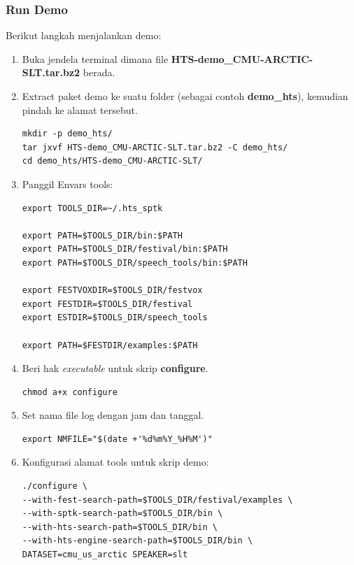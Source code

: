 \documentclass[12pt,]{article}
\begin{document}
	\subsubsection{Run Demo}
	Berikut langkah menjalankan demo:
	
	\begin{enumerate}
		\item Buka jendela terminal dimana file \textbf{HTS-demo\_CMU-ARCTIC-SLT.tar.bz2} berada.
		
		\item Extract paket demo ke suatu folder (sebagai contoh \textbf{demo\_hts}), kemudian pindah ke alamat tersebut.
		\begin{verbatim}
mkdir -p demo_hts/
tar jxvf HTS-demo_CMU-ARCTIC-SLT.tar.bz2 -C demo_hts/
cd demo_hts/HTS-demo_CMU-ARCTIC-SLT/
		\end{verbatim}
		
		\item Panggil Envars tools:
		\begin{verbatim}
export TOOLS_DIR=~/.hts_sptk

export PATH=$TOOLS_DIR/bin:$PATH
export PATH=$TOOLS_DIR/festival/bin:$PATH
export PATH=$TOOLS_DIR/speech_tools/bin:$PATH

export FESTVOXDIR=$TOOLS_DIR/festvox
export FESTDIR=$TOOLS_DIR/festival
export ESTDIR=$TOOLS_DIR/speech_tools

export PATH=$FESTDIR/examples:$PATH
		\end{verbatim}
		
		\newpage
		\item Beri hak \textit{executable} untuk skrip \textbf{configure}.
		\begin{verbatim}
chmod a+x configure
		\end{verbatim}
		
		\item Set nama file log dengan jam dan tanggal.
		\begin{verbatim}
export NMFILE="$(date +'%d%m%Y_%H%M')"
		\end{verbatim}
		
		\item Konfigurasi alamat tools untuk skrip demo:
			\begin{verbatim}
./configure \
--with-fest-search-path=$TOOLS_DIR/festival/examples \
--with-sptk-search-path=$TOOLS_DIR/bin \
--with-hts-search-path=$TOOLS_DIR/bin \
--with-hts-engine-search-path=$TOOLS_DIR/bin \
DATASET=cmu_us_arctic SPEAKER=slt
		\end{verbatim}


\end{enumerate}
\end{document}
